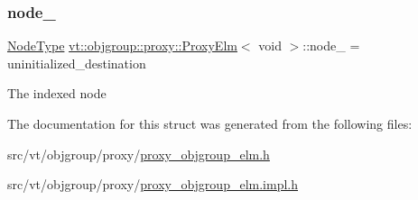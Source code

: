 \subsubsection{\texorpdfstring{node\+\_\+}{node\_}}
{\footnotesize\ttfamily \hyperlink{namespacevt_a866da9d0efc19c0a1ce79e9e492f47e2}{Node\+Type} \hyperlink{structvt_1_1objgroup_1_1proxy_1_1_proxy_elm}{vt\+::objgroup\+::proxy\+::\+Proxy\+Elm}$<$ void $>$\+::node\+\_\+ = uninitialized\+\_\+destination\hspace{0.3cm}{\ttfamily [private]}}

The indexed node 

The documentation for this struct was generated from the following files\+:\begin{DoxyCompactItemize}
\item 
src/vt/objgroup/proxy/\hyperlink{proxy__objgroup__elm_8h}{proxy\+\_\+objgroup\+\_\+elm.\+h}\item 
src/vt/objgroup/proxy/\hyperlink{proxy__objgroup__elm_8impl_8h}{proxy\+\_\+objgroup\+\_\+elm.\+impl.\+h}\end{DoxyCompactItemize}
